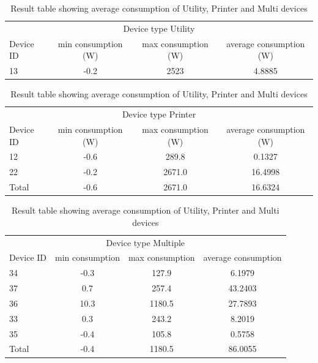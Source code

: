 \begin{table}[h]
	\centering
	\begin{tabular}{l|c|c|c}
		\multicolumn{4}{c}{Device type Utility} \\
		Device ID & min consumption (W)& max consumption (W)& average consumption (W)\\
		13 & -0.2 & 2523 & 4.8885 \\
	\end{tabular}
	\begin{tabular}{l|c|c|c}
		\multicolumn{4}{c}{Device type Printer} \\
		Device ID & min consumption (W)& max consumption (W)& average consumption (W)\\
		12 & -0.6 & 289.8 & 0.1327 \\
		22 & -0.2 & 2671.0 & 16.4998 \\
		\hline
		Total & -0.6 & 2671.0 & 16.6324
	\end{tabular}
	\begin{tabular}{l|c|c|c}
		\multicolumn{4}{c}{Device type Multiple} \\
		Device ID & min consumption & max consumption & average consumption\\
		34 & -0.3 & 127.9 & 6.1979 \\
		37 & 0.7 & 257.4 & 43.2403 \\
		36 & 10.3 & 1180.5 & 27.7893 \\
		33 & 0.3 & 243.2 & 8.2019 \\
		35 & -0.4 & 105.8 & 0.5758 \\
		\hline
		Total & -0.4 & 1180.5 &86.0055 \\ 
	\end{tabular}
	\caption{Result table showing average consumption of Utility, Printer and Multi devices}
	\label{tab:devices}
\end{table}

